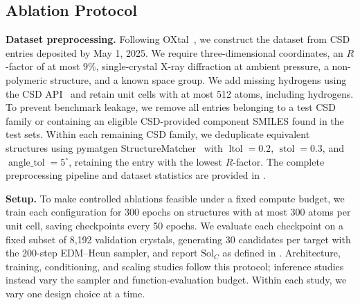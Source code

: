 \subsection{Ablation Protocol}
\label{sec:ablations-setup}

\textbf{Dataset preprocessing.}
Following OXtal~\citep{jin2025oxtal}, we construct the dataset from CSD entries
deposited by May 1, 2025. We require three-dimensional coordinates, an
$R$-factor of at most $9\%$, single-crystal X-ray diffraction at ambient
pressure, a non-polymeric structure, and a known space group. We add missing
hydrogens using the CSD API~\citep{sykes2024scripting} and retain unit cells
with at most 512 atoms, including hydrogens. To prevent benchmark leakage, we
remove all entries belonging to a test CSD family or containing an eligible
CSD-provided component SMILES found in the test sets. Within each remaining CSD
family, we deduplicate equivalent structures using pymatgen
StructureMatcher~\citep{ong2013pymatgen} with $\operatorname{ltol}=0.2$,
$\operatorname{stol}=0.3$, and $\operatorname{angle\_tol}=5^\circ$, retaining the entry
with the lowest $R$-factor. The complete preprocessing pipeline and dataset
statistics are provided in .

\textbf{Setup.}
To make controlled ablations feasible under a fixed compute budget, we train each
configuration for 300 epochs on structures with at most 300 atoms per unit cell,
saving checkpoints every 50 epochs. We evaluate each checkpoint on a fixed subset
of 8{,}192 validation crystals, generating 30 candidates per target with the
200-step EDM--Heun sampler, and report $\mathrm{Sol}_C$ as defined in
. Architecture, training, conditioning, and scaling
studies follow this protocol; inference studies instead vary the sampler and
function-evaluation budget. Within each study, we vary one design choice at a time.
